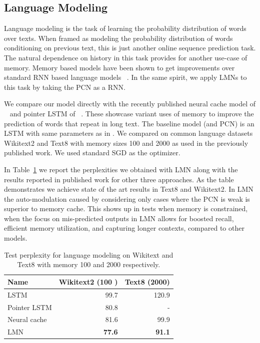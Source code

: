 \documentclass[letterpaper]{article} %
\begin{document}
\vspace{-1.74mm}
\subsection{Language Modeling}
Language modeling is the task of learning the probability distribution of words over texts. When framed as modeling the probability distribution of words conditioning on previous text, this is just another online sequence prediction task. The natural dependence on history in this task provides for another use-case of memory. Memory based models have been shown to get improvements over standard RNN based language models ~\cite{SukhbaatarSWF15,merity2016pointer,grave2016improving}.
In the same spirit, we apply LMNs to this task by taking the PCN as a RNN.

We compare our model directly with the recently published neural cache model of ~\cite{grave2016improving} and pointer LSTM of ~\cite{merity2016pointer}. These showcase variant uses of memory to improve the prediction of words that repeat in long text.  The baseline model (and PCN) is an LSTM with same parameters as in \cite{grave2016improving}.
We compared on common language datasets Wikitext2 and Text8 with memory sizes 100 and 2000 as used in the previously published work. We used standard SGD as the optimizer.

In Table~\ref{tab-lm} we report the perplexities we obtained with LMN along with the results reported in published work for other three approaches. As the table demonstrates we achieve state of the art results in Text8 and Wikitext2. In LMN the auto-modulation caused by considering only cases where the PCN is weak is superior to memory cache. This shows up in tests when memory is constrained, when the focus on mis-predicted outputs in LMN allows for boosted recall, efficient memory utilization, and capturing longer contexts, compared to other models.

\begin{table}
\begin{center}
\begin{tabular}{|l|r|r|} \hline
Name &    Wikitext2 (100 ) &  Text8 (2000)\\ \hline
LSTM & 99.7 & 120.9 \\
Pointer LSTM &	80.8	& -\\
Neural cache &  81.6 &  99.9\\
LMN &	\textbf{77.6}	& \textbf{91.1}\\ \hline
\end{tabular}
\end{center}
\caption{ \label{tab-lm} Test perplexity for language modeling on Wikitext and Text8 with memory 100 and 2000 respectively.}
\end{table}
\end{document}
